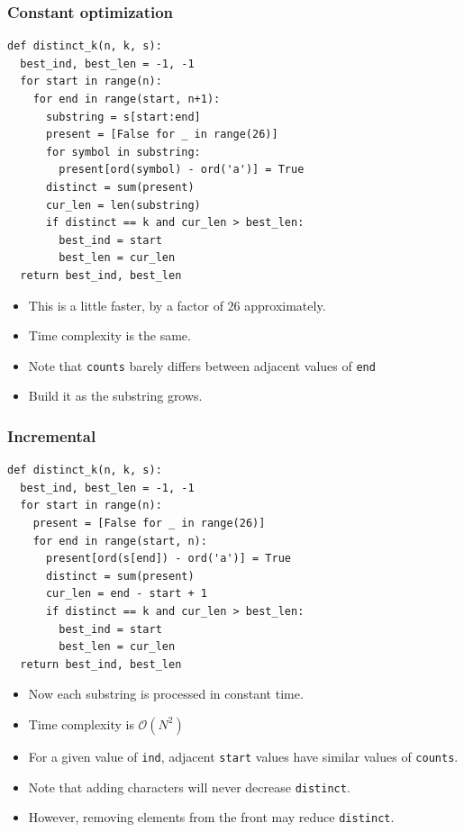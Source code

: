 \documentclass{beamer}
\begin{document}
\begin{frame}
    \frametitle{Constant optimization}
	\begin{tiny}
        \begin{verbatim}
def distinct_k(n, k, s):
  best_ind, best_len = -1, -1
  for start in range(n):
    for end in range(start, n+1):
      substring = s[start:end]
      present = [False for _ in range(26)]
      for symbol in substring:
        present[ord(symbol) - ord('a')] = True
      distinct = sum(present)
      cur_len = len(substring)
      if distinct == k and cur_len > best_len:
        best_ind = start
        best_len = cur_len
  return best_ind, best_len
        \end{verbatim}
    \end{tiny}
    \begin{itemize}
        \item<2-> This is a little faster, by a factor of $26$ approximately.
        \item<3-> Time complexity is the same.
        \item<4-> Note that \texttt{counts} barely differs between adjacent values of \texttt{end}
        \item<5-> Build it as the substring grows.
    \end{itemize}
\end{frame}

\begin{frame}
    \frametitle{Incremental}
	\begin{tiny}
        \begin{verbatim}
def distinct_k(n, k, s):
  best_ind, best_len = -1, -1
  for start in range(n):
    present = [False for _ in range(26)]
    for end in range(start, n):
      present[ord(s[end]) - ord('a')] = True
      distinct = sum(present)
      cur_len = end - start + 1
      if distinct == k and cur_len > best_len:
        best_ind = start
        best_len = cur_len
  return best_ind, best_len
        \end{verbatim}
    \end{tiny}
    \begin{itemize}
        \item<2-> Now each substring is processed in constant time.
        \item<3-> Time complexity is $\mathcal{O}(N^2)$
        \item<4-> For a given value of \texttt{ind}, adjacent \texttt{start} values have similar values of \texttt{counts}.
        \item<5-> Note that adding characters will never decrease \texttt{distinct}.
        \item<6-> However, removing elements from the front may reduce \texttt{distinct}.
    \end{itemize}
\end{frame}
\end{document}
